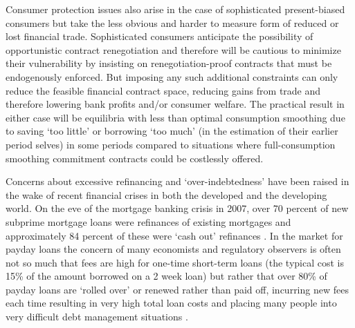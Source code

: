 \documentclass[11pt,english]{article}
\theoremstyle{plain}
\theoremstyle{definition}
\begin{document}
Consumer protection issues also arise in the case of sophisticated
present-biased consumers but take the less obvious and harder to measure
form of reduced or lost financial trade. Sophisticated consumers anticipate
the possibility of opportunistic contract renegotiation and therefore
will be cautious to minimize their vulnerability by insisting on renegotiation-proof
contracts that must be endogenously enforced. But imposing any such
additional constraints can only reduce the feasible financial contract
space, reducing gains from trade and therefore lowering bank profits
and/or consumer welfare. The practical result in either case will
be equilibria with less than optimal consumption smoothing due to
saving `too little' or borrowing `too much' (in the estimation of
their earlier period selves) in some periods compared to situations
where full-consumption smoothing commitment contracts could be costlessly
offered.

Concerns about excessive refinancing and `over-indebtedness' have
been raised in the wake of recent financial crises in both the developed
and the developing world. On the eve of the mortgage banking crisis
in 2007, over 70 percent of new subprime mortgage loans were refinances
of existing mortgages and approximately 84 percent of these were `cash
out' refinances \citep{demyanyk_understanding_2011}. In the market
for payday loans the concern of many economists and regulatory observers
is often not so much that fees are high for one-time short-term loans
(the typical cost is 15\% of the amount borrowed on a 2 week loan)
but rather that over 80\% of payday loans are `rolled over' or renewed
rather than paid off, incurring new fees each time resulting in very
high total loan costs and placing many people into very difficult
debt management situations \citet{deyoung_reframing_2015}.
\end{document}
